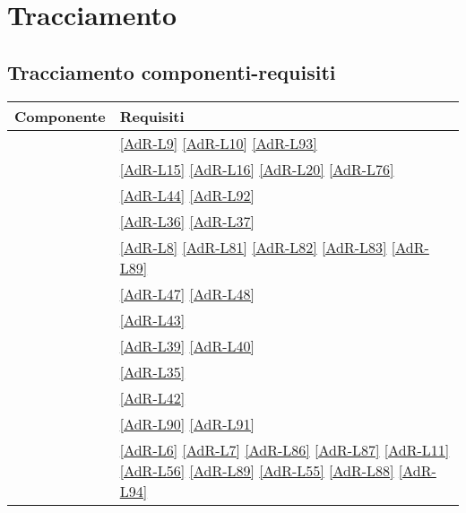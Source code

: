 \section{Tracciamento}
\subsection{Tracciamento componenti-requisiti}
\begin{longtable}{|>{\centering}P{7cm}|>{\centering}P{5cm}|}
	\hline \textbf{Componente} & \textbf{Requisiti} \tabularnewline 
	\endfirsthead
	\hline {} & \ref{AdR-L9} \linebreak \ref{AdR-L10} \linebreak \ref{AdR-L93} \tabularnewline
	\hline {} & \ref{AdR-L15} \linebreak \ref{AdR-L16} \linebreak \ref{AdR-L20} \linebreak \ref{AdR-L76} \tabularnewline
	\hline {} & \ref{AdR-L44} \linebreak \ref{AdR-L92} \tabularnewline
	\hline {} & \ref{AdR-L36} \linebreak \ref{AdR-L37} \tabularnewline
	\hline {} & \ref{AdR-L8} \linebreak \ref{AdR-L81} \linebreak \ref{AdR-L82} \linebreak \ref{AdR-L83} \linebreak \ref{AdR-L89} \tabularnewline
	\hline {} & \ref{AdR-L47} \linebreak \ref{AdR-L48} \tabularnewline
	\hline {} & \ref{AdR-L43} \tabularnewline
	\hline {} & \ref{AdR-L39} \linebreak \ref{AdR-L40} \tabularnewline
	\hline {} & \ref{AdR-L35} \tabularnewline
	\hline {} & \ref{AdR-L42} \tabularnewline
	\hline {} & \ref{AdR-L90} \linebreak \ref{AdR-L91} \tabularnewline
	\hline {} & \ref{AdR-L6} \linebreak \ref{AdR-L7} \linebreak \ref{AdR-L86} \linebreak \ref{AdR-L87} \linebreak \ref{AdR-L11} \linebreak \ref{AdR-L56} \linebreak \ref{AdR-L89} \linebreak \ref{AdR-L55} \linebreak \ref{AdR-L88} \linebreak \ref{AdR-L94} \tabularnewline

\end{longtable}
